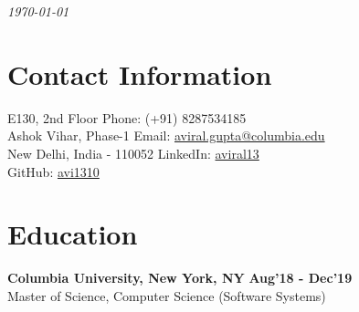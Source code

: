 \documentclass[margin,line]{res}
\begin{document}
 \hfill {\em \today}

\begin{resume}
\section{\sc Contact Information}

\vspace{.025in}
E130, 2nd Floor \hfill {Phone: } (+91) 8287534185 \\
Ashok Vihar, Phase-1 \hfill {Email: } \href{mailto:aviral.gupta@columbia.edu}{aviral.gupta@columbia.edu}\\
New Delhi, India - 110052 \hfill {LinkedIn: }{\href{https://www.linkedin.com/in/aviral13/}{aviral13}}\\
\null \hfill {GitHub: }{\href{https://github.com/avi1310}{avi1310}}
    




\section{\sc Education}
{\bf Columbia University, New York, NY} \hfill {\bf Aug'18 - Dec'19}\\
Master of Science, Computer Science (Software Systems) %



\end{resume}
\end{document}

